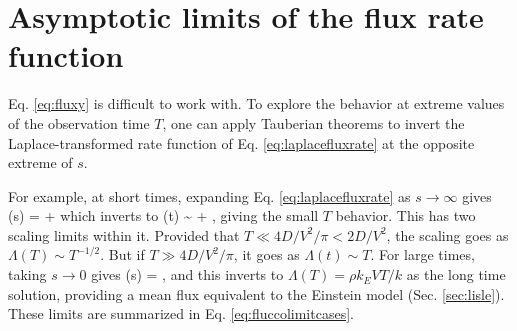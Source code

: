\section{Asymptotic limits of the flux rate function}
\label{sec:fluxlimits}
Eq. \ref{eq:fluxy} is difficult to work with. To explore the behavior at extreme values of the observation time $T$, one can apply Tauberian theorems \citep{Weiss1994} to invert the Laplace-transformed rate function of Eq. \ref{eq:laplacefluxrate} at the opposite extreme of $s$.
	
For example, at short times, expanding Eq. \ref{eq:laplacefluxrate} as $s\rightarrow \infty$ gives
\be \tilde{\Lambda}(s) =  +  \ee
which inverts to
\be \Lambda(t) \sim {} + ,\ee
giving the small $T$ behavior.
This has two scaling limits within it. Provided that $T \ll 4D/V^2/\pi < 2 D/V^2$, the scaling goes as $\Lambda(T) \sim T^{-1/2}$. But if $T\gg 4D/V^2/\pi$, it goes as $\Lambda(t) \sim T$.
For large times, taking $s\rightarrow 0 $ gives
\be \tilde{\Lambda}(s) = , \ee
and this inverts to $\Lambda(T) = \rho k_E V T/k$ as the long time solution, providing a mean flux equivalent to the Einstein model (Sec. \ref{sec:lisle}).
These limits are summarized in Eq. \ref{eq:fluccolimitcases}.
